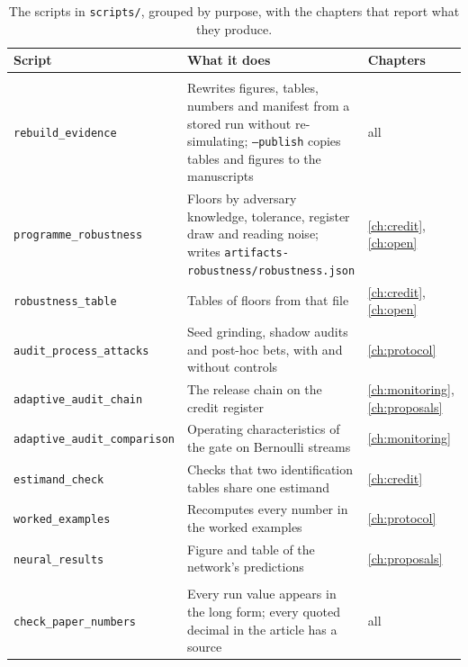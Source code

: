 \begin{table}[ht]
\centering
\caption{The scripts in \texttt{scripts/\allowbreak{}}, grouped by purpose, with the chapters that
report what they produce.}
\label{app:tab-scripts}
\footnotesize
\setlength{\tabcolsep}{3pt}
\begin{tabular}{@{}>{\raggedright\arraybackslash}p{4.6cm}>{\raggedright\arraybackslash}p{7.6cm}>{\raggedright\arraybackslash}p{2.2cm}@{}}
\toprule
Script & What it does & Chapters \\
\midrule
\multicolumn{3}{@{}l}{\emph{Evidence for the book}}\\
\texttt{rebuild\_\allowbreak{}evidence} & Rewrites figures, tables, numbers and manifest from a
stored run without re-simulating; \texttt{--publish} copies tables and figures to
the manuscripts & all \\
\texttt{programme\_\allowbreak{}robustness} & Floors by adversary knowledge, tolerance, register
draw and reading noise; writes \texttt{artifacts-robustness/\allowbreak{}robustness.\allowbreak{}json} &
\ref{ch:credit}, \ref{ch:open} \\
\texttt{robustness\_\allowbreak{}table} & Tables of floors from that file & \ref{ch:credit},
\ref{ch:open} \\
\texttt{audit\_\allowbreak{}process\_\allowbreak{}attacks} & Seed grinding, shadow audits and post-hoc bets,
with and without controls & \ref{ch:protocol} \\
\texttt{adaptive\_\allowbreak{}audit\_\allowbreak{}chain} & The release chain on the credit register &
\ref{ch:monitoring}, \ref{ch:proposals} \\
\texttt{adaptive\_\allowbreak{}audit\_\allowbreak{}comparison} & Operating characteristics of the gate on
Bernoulli streams & \ref{ch:monitoring} \\
\texttt{estimand\_\allowbreak{}check} & Checks that two identification tables share one estimand
& \ref{ch:credit} \\
\texttt{worked\_\allowbreak{}examples} & Recomputes every number in the worked examples &
\ref{ch:protocol} \\
\texttt{neural\_\allowbreak{}results} & Figure and table of the network's predictions &
\ref{ch:proposals} \\
\addlinespace
\multicolumn{3}{@{}l}{\emph{Checks on the manuscripts}}\\
\texttt{check\_\allowbreak{}paper\_\allowbreak{}numbers} & Every run value appears in the long form; every
quoted decimal in the article has a source & all \\

\end{tabular}
\end{table}
